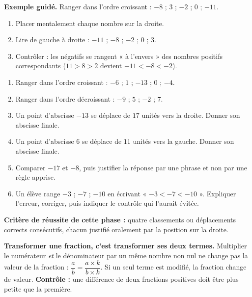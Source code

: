 \documentclass[10pt,a4paper]{article}
\begin{document}
\begin{graybox}
\textbf{Exemple guidé.} Ranger dans l'ordre croissant : $-8$ ; $3$ ; $-2$ ; $0$ ; $-11$.
\begin{enumerate}
\item Placer mentalement chaque nombre sur la droite.
\item Lire de gauche à droite : $-11$ ; $-8$ ; $-2$ ; $0$ ; $3$.
\item Contrôler : les négatifs se rangent « à l'envers » des nombres positifs correspondants ($11 > 8 > 2$ devient $-11 < -8 < -2$).
\end{enumerate}
\end{graybox}
\begin{enumerate}
\needspace{18mm}
\item Ranger dans l'ordre croissant : $-6$ ; $1$ ; $-13$ ; $0$ ; $-4$.
\needspace{18mm}
\item Ranger dans l'ordre décroissant : $-9$ ; $5$ ; $-2$ ; $7$.
\needspace{18mm}
\item Un point d'abscisse $-13$ se déplace de $17$ unités vers la droite. Donner son abscisse finale.
\needspace{18mm}
\item Un point d'abscisse $6$ se déplace de $11$ unités vers la gauche. Donner son abscisse finale.
\needspace{18mm}
\item Comparer $-17$ et $-8$, puis justifier la réponse par une phrase et non par une règle apprise.
\needspace{18mm}
\item Un élève range $-3$ ; $-7$ ; $-10$ en écrivant « $-3 < -7 < -10$ ». Expliquer l'erreur, corriger, puis indiquer le contrôle qui l'aurait évitée.
\end{enumerate}
\begin{successbox}\textbf{Critère de réussite de cette phase :} quatre classements ou déplacements corrects consécutifs, chacun justifié oralement par la position sur la droite.\end{successbox}
\certline
\needspace{62mm}\par\vspace{3mm}
\begin{methodbox}
\textbf{Transformer une fraction, c'est transformer ses deux termes.} Multiplier le numérateur \emph{et}
le dénominateur par un même nombre non nul ne change pas la valeur de la fraction :
$\dfrac{a}{b}=\dfrac{a\times k}{b\times k}$. Si un seul terme est modifié, la fraction change de valeur.
\textbf{Contrôle :} une différence de deux fractions positives doit être plus petite que la première.
\end{methodbox}
\end{document}
